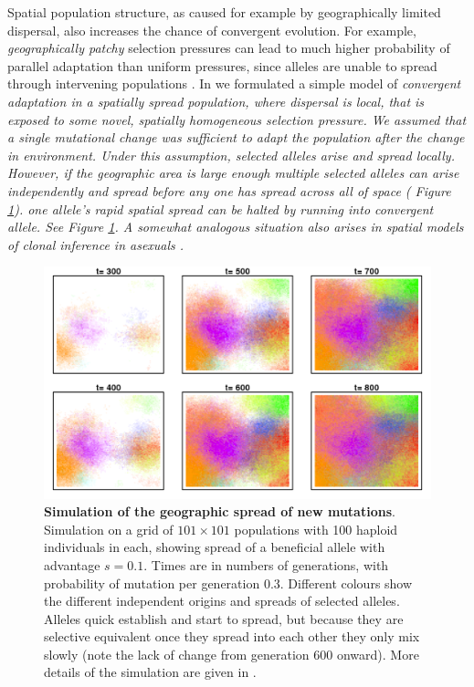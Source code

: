 \documentclass{article}
\newcommand{\gc}[1]{{\it\color{blue} #1} }
\begin{document}
Spatial population structure,
as caused for example by geographically limited dispersal, 
also increases the chance of convergent evolution. 
For example, 
\gc{geographically patchy} selection pressures can lead to much higher probability of parallel adaptation than uniform pressures,
since alleles are unable to spread through intervening populations
\citep{RalphCoop:14}. 
In \citet{ralphcoop2010} we formulated a simple model of \gc{convergent adaptation in 
 a spatially spread population, where dispersal is local,
that is exposed to some novel, spatially homogeneous selection pressure.
We assumed that a single mutational change was sufficient to adapt
the population after the change in environment. Under this assumption,
selected alleles arise and spread locally. However, if the geographic
area is large enough multiple selected alleles can
arise independently and spread before any one has spread across all of
space ( Figure \ref{fig:sim-spread}).  one allele's rapid spatial spread can be
halted by running into convergent allele. See Figure
\ref{fig:sim-spread}. A somewhat analogous situation also arises in spatial models of clonal
inference in asexuals \citep{gordo_adaptive_2006,martens_interfering_2011,otwinowski_clonal_2014}.}



\begin{figure}[ht]
  \begin{center}
    \includegraphics[width=\textwidth]{sims/Peter_sims.png}
  \end{center}
  \caption{
{\bf Simulation of the geographic spread of new mutations}. Simulation
on a grid of $101 \times 101$ populations with 100 haploid individuals
in each, showing spread of a beneficial allele with advantage $s=0.1$.
Times are in numbers of generations, with probability of mutation per
generation 0.3. Different colours show the different independent
origins and spreads of selected alleles. Alleles quick establish and
start to spread, but because they are selective equivalent once they
spread into each other they only mix slowly (note the lack of change
from generation 600 onward). More details of the
simulation are given in \citet{ralphcoop2010}. 
}
  \label{fig:sim-spread}
\end{figure}
\end{document}
